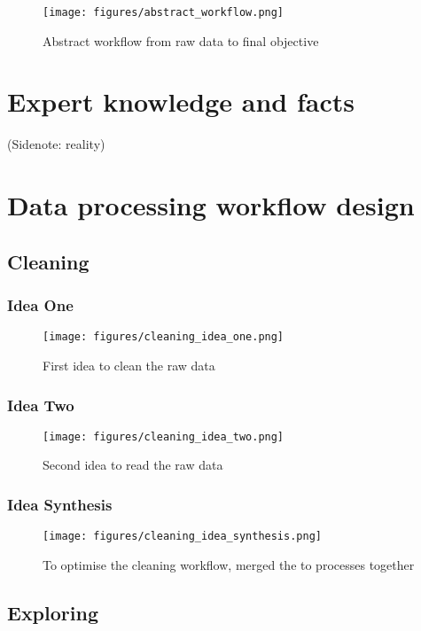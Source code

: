 \begin{figure}[!ht]
\centering
\texttt{[image: figures/abstract\_workflow.png]}
\caption{Abstract workflow from raw data to final objective} 
\end{figure}

\section{Expert knowledge and facts}
(Sidenote: reality)
\section{Data processing workflow design}
	\subsection{Cleaning}
		\subsubsection{Idea One}
\begin{figure}[!ht]
\centering
\texttt{[image: figures/cleaning\_idea\_one.png]}
\caption{First idea to clean the raw data} 
\end{figure}
		\subsubsection{Idea Two}
\begin{figure}[!ht]
\centering
\texttt{[image: figures/cleaning\_idea\_two.png]}
\caption{Second idea to read the raw data} 
\end{figure}
		\subsubsection{Idea Synthesis}
\begin{figure}[!ht]
\centering
\texttt{[image: figures/cleaning\_idea\_synthesis.png]}
\caption{To optimise the cleaning workflow, merged the to processes together} 
\end{figure}
	\subsection{Exploring}
